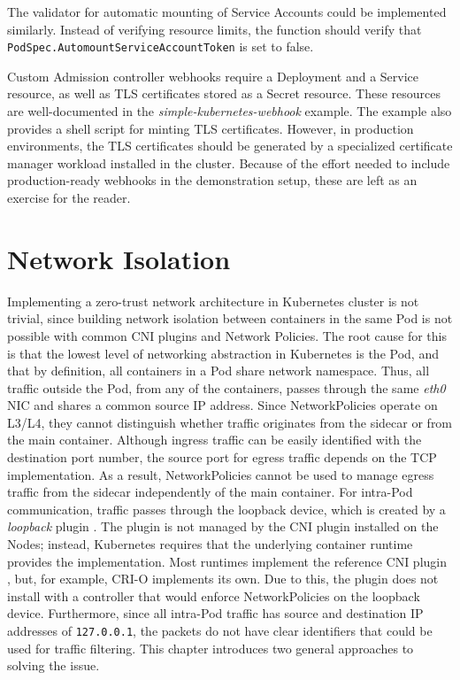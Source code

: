 \documentclass[english, 12pt, a4paper, sci, utf8, a-2b, online]{aaltothesis}
\begin{document}


The validator for automatic mounting of Service Accounts could be implemented similarly.
Instead of verifying resource limits, the function should verify that \lstinline{PodSpec.AutomountServiceAccountToken} is set to false.

Custom Admission controller webhooks require a Deployment and a Service resource, as well as TLS certificates stored as a Secret resource.
These resources are well-documented in the \emph{simple-kubernetes-webhook} example.
The example also provides a shell script for minting TLS certificates.
However, in production environments, the TLS certificates should be generated by a specialized certificate manager workload installed in the cluster.
Because of the effort needed to include production-ready webhooks in the demonstration setup, these are left as an exercise for the reader.

\clearpage

\section{Network Isolation} \label{sec:network-solution}

Implementing a zero-trust network architecture in Kubernetes cluster is not trivial, since building network isolation between containers in the same Pod is not possible with common CNI plugins and Network Policies.
The root cause for this is that the lowest level of networking abstraction in Kubernetes is the Pod, and that by definition, all containers in a Pod share network namespace.
Thus, all traffic outside the Pod, from any of the containers, passes through the same \emph{eth0} NIC and shares a common source IP address.
Since NetworkPolicies operate on L3/L4, they cannot distinguish whether traffic originates from the sidecar or from the main container.
Although ingress traffic can be easily identified with the destination port number, the source port for egress traffic depends on the TCP implementation.
As a result, NetworkPolicies cannot be used to manage egress traffic from the sidecar independently of the main container.
For intra-Pod communication, traffic passes through the loopback device, which is created by a \emph{loopback} plugin \cite{k8s-docs-cni}.
The plugin is not managed by the CNI plugin installed on the Nodes; instead, Kubernetes requires that the underlying container runtime provides the implementation.
Most runtimes implement the reference CNI plugin \cite{cni-loopback}, but, for example, CRI-O implements its own.
Due to this, the plugin does not install with a controller that would enforce NetworkPolicies on the loopback device.
Furthermore, since all intra-Pod traffic has source and destination IP addresses of \lstinline{127.0.0.1}, the packets do not have clear identifiers that could be used for traffic filtering.
This chapter introduces two general approaches to solving the issue.
\end{document}
